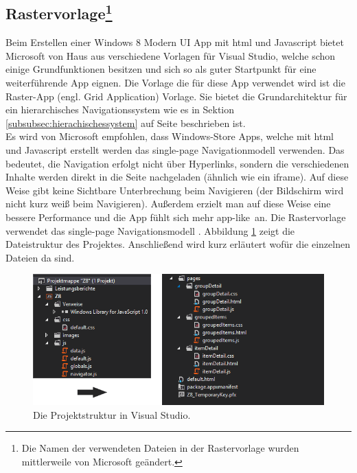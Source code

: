 \documentclass[12pt,a4paper]{scrartcl}
\begin{document}
\subsection[Rastervorlage] {Rastervorlage\footnote{Die Namen der verwendeten Dateien in der Rastervorlage wurden mittlerweile von Microsoft geändert.}}
\label{subsec:rastervorlage}
Beim Erstellen einer Windows 8 Modern UI App mit \ac{html} und Javascript bietet Microsoft von Haus aus verschiedene Vorlagen für Visual Studio, welche schon einige Grundfunktionen besitzen und sich so als guter Startpunkt für eine weiterführende App eignen. Die Vorlage die für diese App verwendet wird ist die Raster-App (engl. Grid Application) Vorlage. Sie bietet die Grundarchitektur für ein hierarchisches Navigationssystem wie es in Sektion \ref{subsubsec:hierachischessystem} auf Seite \pageref{subsubsec:hierachischessystem} beschrieben ist.\\
Es wird von Microsoft empfohlen, dass Windows-Store Apps, welche mit \ac{html} und Javascript erstellt werden das single-page Navigationmodell verwenden. Das bedeutet, die Navigation erfolgt nicht über Hyperlinks, sondern die verschiedenen Inhalte werden direkt in die Seite nachgeladen (ähnlich wie ein iframe). Auf diese Weise gibt keine Sichtbare Unterbrechung beim Navigieren (der Bildschirm wird nicht kurz weiß beim Navigieren). Außerdem erzielt man auf diese Weise eine bessere Performance und die App fühlt sich mehr \glqq app-like\grqq\ an. Die Rastervorlage verwendet das single-page Navigationsmodell \citep{MicrosoftSinglePage2013}. Abbildung \ref{fig:projektmappe} zeigt die Dateistruktur des Projektes. Anschließend wird kurz erläutert wofür die einzelnen Dateien da sind.

\begin{figure}[h]
	\centering
	\includegraphics[width=\textwidth]{Bilder/Screenshots/app/projektmappe.png} 
	\caption{Die Projektstruktur in Visual Studio.}
	\label{fig:projektmappe}
\end{figure}
\end{document}
